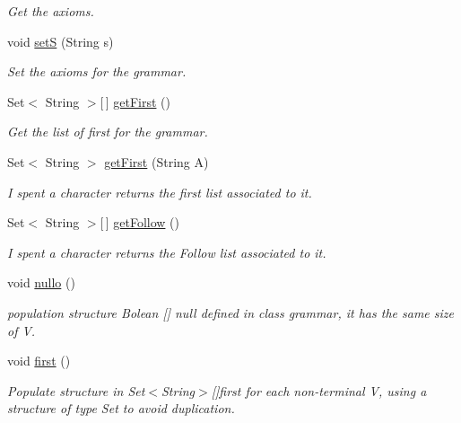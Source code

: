 \begin{DoxyCompactItemize}
\begin{DoxyCompactList}\small\item\em Get the axioms. \end{DoxyCompactList}\item 
void \hyperlink{classcontext_free_1_1grammar_1_1_context_free_grammar_a2f4c3ec7270d799ed127cb162e0213b3}{set\-S} (String s)
\begin{DoxyCompactList}\small\item\em Set the axioms for the grammar. \end{DoxyCompactList}\item 
Set$<$ String $>$\mbox{[}$\,$\mbox{]} \hyperlink{classcontext_free_1_1grammar_1_1_context_free_grammar_adc3a25917132474960be34329cdaead9}{get\-First} ()
\begin{DoxyCompactList}\small\item\em Get the list of first for the grammar. \end{DoxyCompactList}\item 
Set$<$ String $>$ \hyperlink{classcontext_free_1_1grammar_1_1_context_free_grammar_a2140cdc636585e9714e8dc42c936eee5}{get\-First} (String A)
\begin{DoxyCompactList}\small\item\em I spent a character returns the first list associated to it. \end{DoxyCompactList}\item 
Set$<$ String $>$\mbox{[}$\,$\mbox{]} \hyperlink{classcontext_free_1_1grammar_1_1_context_free_grammar_a5dae0e5de95349d310869fb5941cb5be}{get\-Follow} ()
\begin{DoxyCompactList}\small\item\em I spent a character returns the Follow list associated to it. \end{DoxyCompactList}\item 
void \hyperlink{classcontext_free_1_1grammar_1_1_context_free_grammar_ac880ed3ca36ddcd8e20d8279af08244d}{nullo} ()
\begin{DoxyCompactList}\small\item\em population structure Bolean \mbox{[}\mbox{]} null defined in class grammar, it has the same size of V. \end{DoxyCompactList}\item 
void \hyperlink{classcontext_free_1_1grammar_1_1_context_free_grammar_a9c3bfe0b038204420b470fab326ce7bb}{first} ()
\begin{DoxyCompactList}\small\item\em Populate structure in Set$<$\-String$>$\mbox{[}\mbox{]}first for each non-\/terminal V, using a structure of type Set to avoid duplication. \end{DoxyCompactList}\item 

\end{DoxyCompactItemize}
